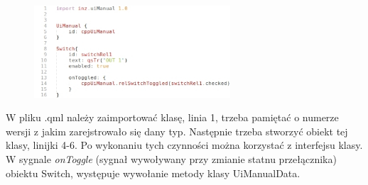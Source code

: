 \documentclass[12pt, eng, twoside, openany, final]{mgr}
\begin{document}
                    \begin{figure}[H]
                    \begin{center}
                        \includegraphics[width=0.65\textwidth]{code_qml.jpg}
                    \end{center}
                    \end{figure}
                    W pliku .qml należy zaimportować klasę, linia 1, trzeba pamiętać o numerze wersji z jakim zarejstrowało się dany typ. Następnie trzeba stworzyć obiekt tej klasy, linijki 4-6.
                    Po wykonaniu tych czynności można korzystać z interfejsu klasy. W sygnale \emph{onToggle} (sygnał wywoływany przy zmianie statnu przełącznika) obiektu Switch, występuje wywołanie metody klasy UiManualData.
                
                \newpage
                
                
\end{document}
